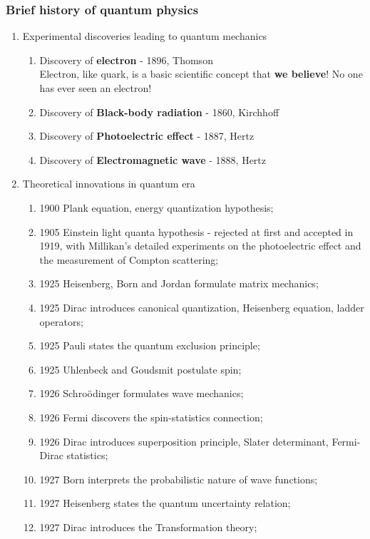 \documentclass[12pt]{article}
\numberwithin{equation}{section}
\begin{document}
\subsubsection{Brief history of quantum physics}
\begin{enumerate}
\item Experimental discoveries leading to quantum mechanics \\
	\begin{enumerate}
	\item Discovery of \textbf{electron} - 1896, Thomson \\
		Electron, like quark, is a basic scientific concept that \textbf{we believe}! No one has ever seen an electron!
	\item Discovery of \textbf{Black-body radiation} - 1860, Kirchhoff
	\item Discovery of \textbf{Photoelectric effect} - 1887, Hertz
	\item Discovery of \textbf{Electromagnetic wave} - 1888, Hertz
	\end{enumerate}	
\item Theoretical innovations in quantum era
	\begin{enumerate}
	\item 1900 Plank equation, energy quantization hypothesis;
	\item 1905 Einstein light quanta hypothesis - rejected at first and accepted in 1919, with Millikan's detailed experiments on the photoelectric effect and the measurement of Compton scattering;
	\item 1925 Heisenberg, Born and Jordan formulate matrix mechanics;
	\item 1925 Dirac introduces canonical quantization, Heisenberg equation, ladder operators;
	\item 1925 Pauli states the quantum exclusion principle;
	\item 1925 Uhlenbeck and Goudsmit postulate spin;
	\item 1926 Schro\"{o}dinger formulates wave mechanics;
	\item 1926 Fermi discovers the spin-statistics connection;
	\item 1926 Dirac introduces superposition principle, Slater determinant, Fermi-Dirac statistics;
	\item 1927 Born interprets the probabilistic nature of wave functions;
	\item 1927 Heisenberg states the quantum uncertainty relation;
	\item 1927 Dirac introduces the Transformation theory;

\end{enumerate}
\end{enumerate}
\end{document}
